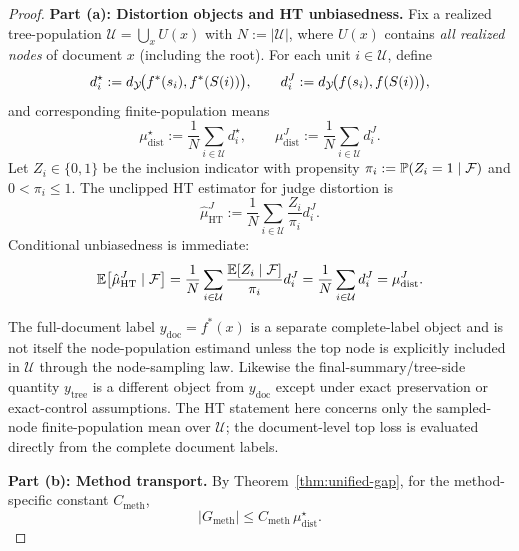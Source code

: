 \begin{proof}
\textbf{Part (a): Distortion objects and HT unbiasedness.}
Fix a realized tree-population $\mathcal{U}=\bigcup_x U(x)$ with $N := |\mathcal{U}|$, where $U(x)$ contains \emph{all realized nodes} of document $x$ (including the root). For each unit $i \in \mathcal{U}$, define
\[
d_i^{\star}:=d_{\mathcal{Y}}\!\big(f^\ast(s_i),f^\ast(S(i))\big),\qquad
d_i^{J}:=d_{\mathcal{Y}}\!\big(f(s_i),f(S(i))\big),
\]
and corresponding finite-population means
\[
\mu_{\mathrm{dist}}^{\star}:=\frac{1}{N}\sum_{i\in\mathcal{U}} d_i^{\star},\qquad
\mu_{\mathrm{dist}}^{J}:=\frac{1}{N}\sum_{i\in\mathcal{U}} d_i^{J}.
\]
Let $Z_i \in \{0,1\}$ be the inclusion indicator with propensity $\pi_i := \mathbb{P}(Z_i=1\mid\mathcal{F})$ and $0<\pi_i\le 1$. The unclipped HT estimator for judge distortion is
\[
\hat{\mu}_{\mathrm{HT}}^{J}:=\frac{1}{N}\sum_{i\in\mathcal{U}} \frac{Z_i}{\pi_i}d_i^{J}.
\]
Conditional unbiasedness is immediate:
\[
\mathbb{E}\!\left[\hat{\mu}_{\mathrm{HT}}^{J}\mid\mathcal{F}\right]
=\frac{1}{N}\sum_{i\in\mathcal{U}}\frac{\mathbb{E}[Z_i\mid\mathcal{F}]}{\pi_i}d_i^{J}
=\frac{1}{N}\sum_{i\in\mathcal{U}} d_i^{J}
=\mu_{\mathrm{dist}}^{J}.
\]

The full-document label $y_{\mathrm{doc}}=f^\ast(x)$ is a separate complete-label object and is not itself the node-population estimand unless the top node is explicitly included in $\mathcal{U}$ through the node-sampling law. Likewise the final-summary/tree-side quantity $y_{\mathrm{tree}}$ is a different object from $y_{\mathrm{doc}}$ except under exact preservation or exact-control assumptions. The HT statement here concerns only the sampled-node finite-population mean over $\mathcal{U}$; the document-level top loss is evaluated directly from the complete document labels.

\textbf{Part (b): Method transport.}
By Theorem~\ref{thm:unified-gap}, for the method-specific constant $C_{\mathrm{meth}}$,
\[
|G_{\mathrm{meth}}| \le C_{\mathrm{meth}}\,\mu_{\mathrm{dist}}^{\star}.
\]


\end{proof}
